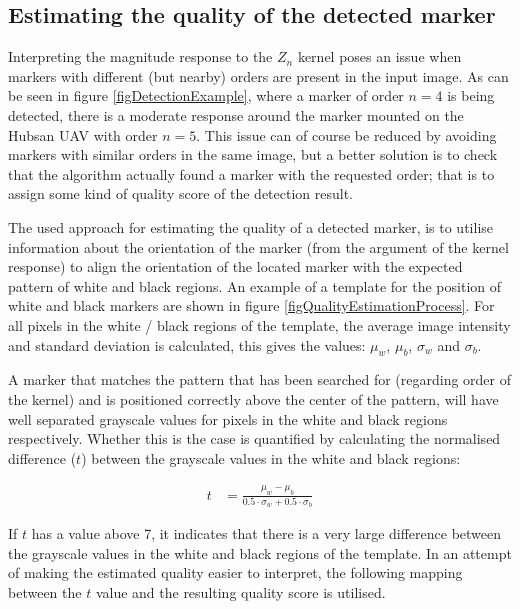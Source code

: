 \documentclass{article}
\begin{document}
\subsection{Estimating the quality of the detected marker} 
Interpreting the magnitude response to the $Z_n$ kernel poses an issue 
when markers with different (but nearby) orders are present in the input image. 
As can be seen in figure \ref{figDetectionExample}, where a marker of order $n = 4$ 
is being detected, there is a moderate response around the marker mounted on the Hubsan UAV with order $n = 5$. 
This issue can of course be reduced by avoiding markers with similar orders in the same image, but 
a better solution is to check that the algorithm actually found a marker with the requested order; that 
is to assign some kind of quality score of the detection result. 
 
The used approach for estimating the quality of a detected marker, is to utilise 
information about the orientation of the marker (from the argument of the kernel response) 
to align the orientation of the located marker with the expected pattern of white and black regions. 
An example of a template for the position of white and black markers are shown in 
figure \ref{figQualityEstimationProcess}. 
For all pixels in the white / black regions of the template, the average image intensity and 
standard deviation is calculated, this gives the values: $\mu_w$, $\mu_b$, $\sigma_w$ and $\sigma_b$. 
 
A marker that matches the pattern that has been searched for (regarding order of the kernel) 
and is positioned correctly above the center of the pattern, will have well separated grayscale values for pixels in the 
white and black regions respectively. 
Whether this is the case is quantified by calculating the normalised difference ($t$) between 
the grayscale values in the white and black regions: 
 
\begin{align} 
t &= \frac{\mu_w - \mu_b}{0.5 \cdot \sigma_w + 0.5 \cdot \sigma_b} 
\end{align} 
 
If $t$ has a value above 7, it indicates that there is a very large difference between the grayscale 
values in the white and black regions of the template. 
In an attempt of making the estimated quality easier to interpret, the following 
mapping between the $t$ value and the resulting quality score is utilised. 
 
\end{document}
